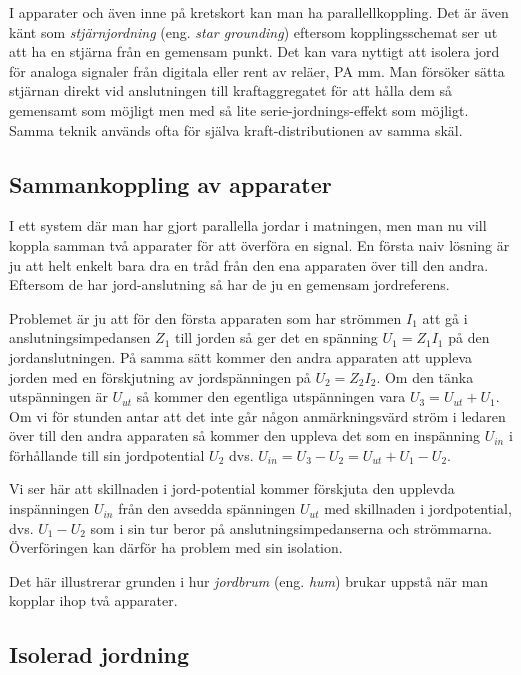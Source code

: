 I apparater och även inne på kretskort kan man ha parallellkoppling. Det är även
känt som \emph{stjärnjordning} (eng. \emph{star grounding}) eftersom
kopplingsschemat ser ut att ha en stjärna från en gemensam punkt. Det kan vara
nyttigt att isolera jord för analoga signaler från digitala eller rent av
reläer, PA mm. Man försöker sätta stjärnan direkt vid anslutningen till
kraftaggregatet för att hålla dem så gemensamt som möjligt men med så lite
serie-jordnings-effekt som möjligt. Samma teknik används ofta för själva
kraft-distributionen av samma skäl.

\subsection{Sammankoppling av apparater}
\label{sammankopplingavapparater}

I ett system där man har gjort parallella jordar i matningen,
men man nu vill koppla samman två apparater för att överföra en signal.
En första naiv lösning är ju att helt enkelt bara dra en tråd från den ena
apparaten över till den andra. Eftersom de har jord-anslutning så har de ju en
gemensam jordreferens.

Problemet är ju att för den första apparaten som har strömmen \(I_1\) att gå i
anslutningsimpedansen \(Z_1\) till jorden så ger det en spänning
\(U_1 = Z_1 I_1\) på den jordanslutningen. På samma sätt kommer den
andra apparaten att uppleva jorden med en förskjutning av jordspänningen på
\(U_2 = Z_2 I_2\). Om den tänka utspänningen är \(U_{ut}\) så kommer den
egentliga utspänningen vara \(U_3 = U_{ut} + U_1\). Om vi för stunden antar att
det inte går någon anmärkningsvärd ström i ledaren över till den andra
apparaten så kommer den uppleva det som en inspänning \(U_{in}\) i förhållande
till sin jordpotential \(U_2\) dvs. \(U_{in} = U_3 - U_2 = U_{ut} + U_1 - U_2\).

Vi ser här att skillnaden i jord-potential kommer förskjuta den upplevda
inspänningen \(U_{in}\) från den avsedda spänningen \(U_{ut}\) med skillnaden i
jordpotential, dvs. \(U_1 - U_2\) som i sin tur beror på anslutningsimpedanserna
och strömmarna. Överföringen kan därför ha problem med sin isolation.

Det här illustrerar grunden i hur \emph{jordbrum} (eng. \emph{hum}) brukar
uppstå när man kopplar ihop två apparater.

\subsection{Isolerad jordning}

